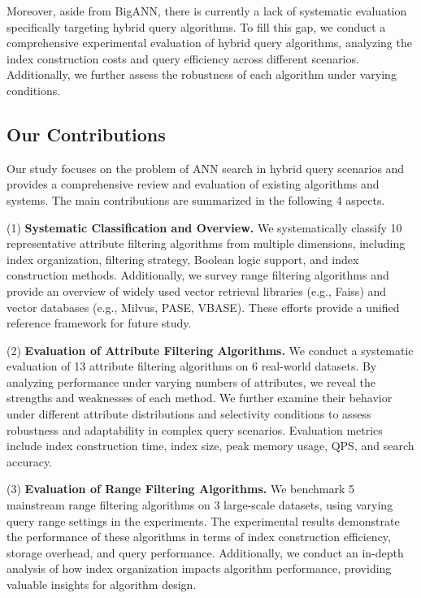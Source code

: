 \documentclass[sigconf, nonacm]{acmart}
\begin{document}
	Moreover, aside from BigANN, there is currently a lack of systematic evaluation specifically targeting hybrid query algorithms. To fill this gap, we conduct a comprehensive experimental evaluation of hybrid query algorithms, analyzing the index construction costs and query efficiency across different scenarios. Additionally, we further assess the robustness of each algorithm under varying conditions.
	
	
	\subsection{Our Contributions}
	
	Our study focuses on the problem of ANN search in hybrid query scenarios and provides a comprehensive review and evaluation of existing algorithms and systems. The main contributions are summarized in the following 4 aspects.
	
	(1)\textbf{ Systematic Classification and Overview.}
	We systematically classify 10 representative attribute filtering algorithms from multiple dimensions, including index organization, filtering strategy, Boolean logic support, and index construction methods. Additionally, we survey range filtering algorithms and provide an overview of widely used vector retrieval libraries (e.g., Faiss) and vector databases (e.g., Milvus, PASE, VBASE). These efforts provide a unified reference framework for future study.
	
	(2)\textbf{ Evaluation of Attribute Filtering Algorithms.}
	We conduct a systematic evaluation of 13 attribute filtering algorithms on 6 real-world datasets. By analyzing performance under varying numbers of attributes, we reveal the strengths and weaknesses of each method. We further examine their behavior under different attribute distributions and selectivity conditions to assess robustness and adaptability in complex query scenarios. Evaluation metrics include index construction time, index size, peak memory usage, QPS, and search accuracy.
	
	(3)\textbf{ Evaluation of Range Filtering Algorithms.}
	We benchmark 5 mainstream range filtering algorithms on 3 large-scale datasets, using varying query range settings in the experiments. The experimental results demonstrate the performance of these algorithms in terms of index construction efficiency, storage overhead, and query performance. Additionally, we conduct an in-depth analysis of how index organization impacts algorithm performance, providing valuable insights for algorithm design.
	
\end{document}
